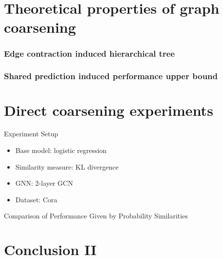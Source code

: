 \documentclass[10pt, aspectratio=169]{beamer}
\begin{document}
\section{Theoretical properties of graph coarsening}

\begin{frame}
	\frametitle{Edge contraction induced hierarchical tree}
	\centerline{\scalebox{0.75}{}}
	\centerline{\scalebox{0.75}{}}
\end{frame}

\begin{frame}
	\frametitle{Shared prediction induced performance upper bound}
    \centering{\scalebox{1.2}{}}
\end{frame}

\section{Direct coarsening experiments}

\begin{frame}{Experiment Setup}
    \begin{itemize}
        \item Base model: logistic regression
        \item Similarity measure: KL divergence
        \item GNN: 2-layer GCN
        \item Dataset: Cora
    \end{itemize}
\end{frame}

\begin{frame}{Comparison of Performance Given by Probability Similarities}
	\centering
    
\end{frame}

\section{Conclusion II}
\end{document}
